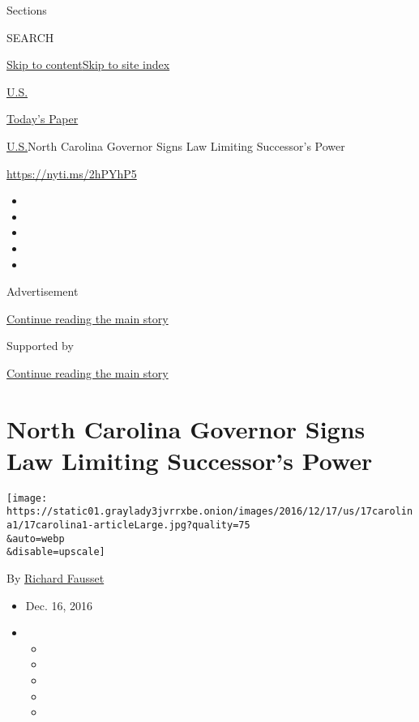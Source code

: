 Sections

SEARCH

\protect\hyperlink{site-content}{Skip to
content}\protect\hyperlink{site-index}{Skip to site index}

\href{https://www.nytimes3xbfgragh.onion/section/us}{U.S.}

\href{https://myaccount.nytimes3xbfgragh.onion/auth/login?response_type=cookie\&client_id=vi}{}

\href{https://www.nytimes3xbfgragh.onion/section/todayspaper}{Today's
Paper}

\href{/section/us}{U.S.}\textbar{}North Carolina Governor Signs Law
Limiting Successor's Power

\url{https://nyti.ms/2hPYhP5}

\begin{itemize}
\item
\item
\item
\item
\item
\end{itemize}

Advertisement

\protect\hyperlink{after-top}{Continue reading the main story}

Supported by

\protect\hyperlink{after-sponsor}{Continue reading the main story}

\hypertarget{north-carolina-governor-signs-law-limiting-successors-power}{%
\section{North Carolina Governor Signs Law Limiting Successor's
Power}\label{north-carolina-governor-signs-law-limiting-successors-power}}

\texttt{[image: https://static01.graylady3jvrrxbe.onion/images/2016/12/17/us/17carolina1/17carolina1-articleLarge.jpg?quality=75\\\&auto=webp\\\&disable=upscale]}

By \href{https://www.nytimes3xbfgragh.onion/by/richard-fausset}{Richard
Fausset}

\begin{itemize}
\item
  Dec. 16, 2016
\item
  \begin{itemize}
  \item
  \item
  \item
  \item
  \item
  \end{itemize}
\end{itemize}

